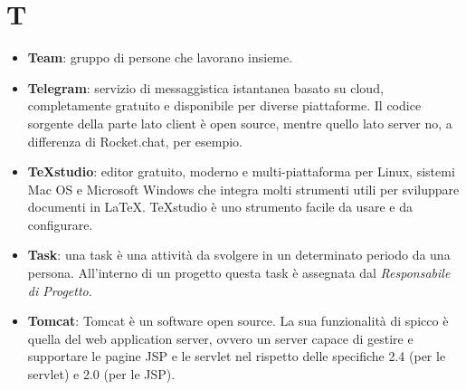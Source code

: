 \section{T}
\begin{itemize}
	\item \textbf{Team}: gruppo di persone che lavorano insieme.
	\item \textbf{Telegram}: servizio di messaggistica istantanea basato su cloud, completamente gratuito e disponibile per diverse piattaforme. Il codice sorgente della parte lato client è open source, mentre quello lato server no, a differenza di Rocket.chat, per esempio.
	\item \textbf{TeXstudio}: editor gratuito, moderno e multi-piattaforma per Linux, sistemi Mac OS e Microsoft Windows che integra molti strumenti utili per sviluppare documenti in \LaTeX. TeXstudio è uno strumento facile da usare e da configurare.
	\item \textbf{Task}: una task è una attività da svolgere in un determinato periodo da una persona. All'interno di un progetto questa task è assegnata dal \textit{Responsabile di Progetto}.
	\item \textbf{Tomcat}: Tomcat è un software open source. La sua funzionalità di spicco è quella del web application server, ovvero un server capace di gestire e supportare le pagine JSP e le servlet nel rispetto delle specifiche 2.4 (per le servlet) e 2.0 (per le JSP).
\end{itemize}

